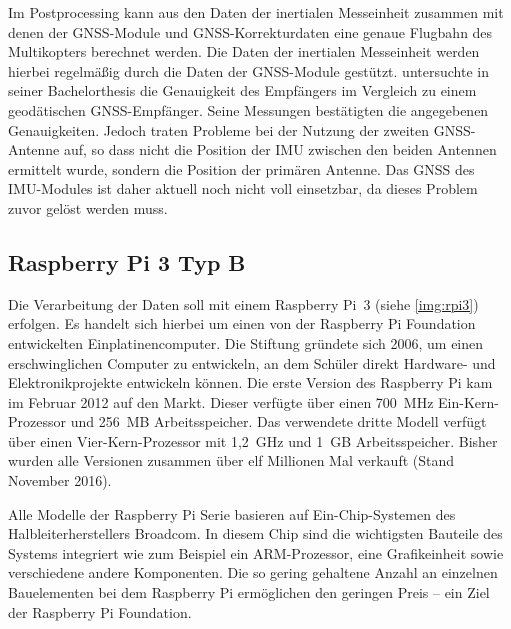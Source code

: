 \documentclass[a4paper,12pt,bibliography=totoc, listof=totoc,titlepage,pointlessnumbers]{scrreprt}
\begin{document}
Im Postprocessing kann aus den Daten der inertialen Messeinheit zusammen mit denen der GNSS-Module und GNSS-Korrekturdaten eine genaue Flugbahn des Multikopters berechnet werden. Die Daten der inertialen Messeinheit werden hierbei re\-gel\-mä\-ßig durch die Daten der GNSS-Module gestützt.
\citet{wilken} untersuchte in seiner Bachelorthesis die Genauigkeit des Empfängers im Vergleich zu einem geodätischen GNSS-Empfänger. Seine Messungen bestätigten die angegebenen Genauigkeiten. Jedoch traten Probleme bei der Nutzung der zweiten GNSS-Antenne auf, so dass nicht die Position der IMU zwischen den beiden Antennen ermittelt wurde, sondern die Position der primären Antenne. Das GNSS des IMU-Modules ist daher aktuell noch nicht voll einsetzbar, da dieses Problem zuvor gelöst werden muss.

\subsection{Rasp\-berry Pi 3 Typ B}
\label{ss:Raspberry}
Die Verarbeitung der Daten soll mit einem Rasp\-berry Pi~3 (siehe \autoref{img:rpi3}) erfolgen. Es handelt sich hierbei um einen von der Rasp\-berry Pi Foundation entwickelten Einplatinencomputer. Die Stiftung gründete sich 2006, um einen erschwinglichen Computer zu entwickeln, an dem Schüler direkt Hardware- und Elektronikprojekte entwickeln können. Die erste Version des Rasp\-berry Pi kam im Februar 2012 auf den Markt. Dieser verfügte über einen 700~MHz Ein-Kern-Prozessor und 256~MB Arbeitsspeicher. Das verwendete dritte Modell verfügt über einen Vier-Kern-Prozessor mit 1,2~GHz und 1~GB Arbeitsspeicher. Bisher wurden alle Versionen zusammen über elf Millionen Mal verkauft (Stand November 2016). \citep{heise5Rasp}

Alle Modelle der Rasp\-berry Pi Serie basieren auf Ein-Chip-Systemen des Halbleiterherstellers Broadcom. In diesem Chip sind die wichtigsten Bauteile des Systems integriert wie zum Beispiel ein ARM-Prozessor, eine Grafikeinheit sowie verschiedene andere Komponenten. Die so gering gehaltene Anzahl an einzelnen Bauelementen bei dem Rasp\-berry Pi ermöglichen den geringen Preis -- ein Ziel der Rasp\-berry Pi Foundation. 
\end{document}
